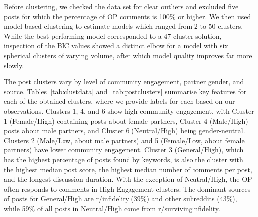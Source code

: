 Before clustering, we checked the data set for clear outliers and excluded five posts for which the percentage of OP comments is 100\% or higher.
We then used model-based clustering to estimate models which ranged from 2 to 50 clusters. While the best performing model corresponded to a 47 cluster solution, inspection of the BIC values showed a distinct elbow for a model with six spherical clusters of varying volume, after which model quality improves far more slowly.

The post clusters vary by level of community engagement, partner gender, and source. Tables~\ref{tab:clustdata} and~\ref{tab:postclusters} summarise key features for each of the obtained clusters, where we provide labels for each based on our observations. Clusters 1, 4, and 6 show high community engagement, with Cluster 1 (Female/High) containing posts about female partners, Cluster 4 (Male/High) posts about male partners, and Cluster 6 (Neutral/High) being gender-neutral. Clusters 2 (Male/Low, about male partners) and 5 (Female/Low, about female partners) have lower community engagement. Cluster 3 (General/High), which has the highest percentage of posts found by keywords, is also the cluster with the highest median post score, the highest median number of comments per post, and the longest discussion duration. With the exception of Neutral/High, the OP often responds to comments in High Engagement clusters.  The dominant sources of posts for General/High are r/infidelity (39\%) and other subreddits (43\%), while 59\% of all posts in Neutral/High come from r/survivinginfidelity. 

